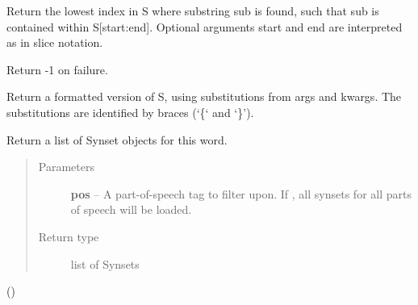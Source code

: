 \documentclass[letterpaper,10pt,english]{sphinxmanual}
\begin{document}
\begin{fulllineitems}
\begin{fulllineitems}
\end{fulllineitems}


\begin{fulllineitems}
\label{api_reference:textblob_de.blob.Word.find}
Return the lowest index in S where substring sub is found,
such that sub is contained within S{[}start:end{]}.  Optional
arguments start and end are interpreted as in slice notation.

Return -1 on failure.

\end{fulllineitems}


\begin{fulllineitems}
\label{api_reference:textblob_de.blob.Word.format}
Return a formatted version of S, using substitutions from args and kwargs.
The substitutions are identified by braces (`\{` and `\}').

\end{fulllineitems}


\begin{fulllineitems}
\label{api_reference:textblob_de.blob.Word.get_synsets}
Return a list of Synset objects for this word.
\begin{quote}\begin{description}
\item[{Parameters}] \leavevmode
\textbf{pos} -- A part-of-speech tag to filter upon. If , all
synsets for all parts of speech will be loaded.

\item[{Return type}] \leavevmode
list of Synsets

\end{description}\end{quote}

()

\end{fulllineitems}



\end{fulllineitems}
\end{document}
